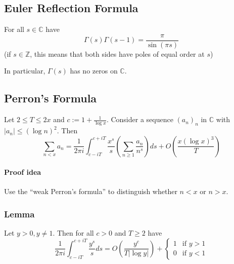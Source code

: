 \documentclass{scrartcl}
\newcommand{\Z}{\mathbb{Z}}
\newcommand{\C}{\mathbb{C}}
\begin{document}
\subsection{Euler Reflection Formula}
For all $s \in \C$ have
\begin{equation*}
    \Gamma(s)\Gamma(s - 1) = \frac \pi {\sin(\pi s)}
\end{equation*}
(if $s \in \Z$, this means that both sides have poles of equal order at $s$)

In particular, $\Gamma(s)$ has no zeros on $\C$.

\subsection{Perron's Formula}
Let $2 \leq T \leq 2x$ and $c := 1 + \frac 1 {\log x}$. Consider a sequence $(a_n)_n$ in $\C$ with $|a_n| \leq (\log n)^2$. Then
\begin{equation*}
    \sum_{n < x} a_n = \frac 1 {2\pi i} \int_{c - iT}^{c + iT} \frac {x^s} s \left( \sum_{n \geq 1} \frac {a_n} {n^s} \right) ds + O\left(\frac {x(\log x)^3} T\right)
\end{equation*}
\paragraph{Proof idea} Use the ``weak Perron's formula'' to distinguish whether $n < x$ or $n > x$.
\subsubsection*{Lemma}
Let $y > 0, y \neq 1$. Then for all $c > 0$ and $T \geq 2$ have
\begin{equation*}
    \frac 1 {2\pi i} \int_{c - iT}^{c + iT} \frac {y^s} s ds = O\left( \frac {y^c} {T |\log y|} \right) + \begin{cases}
        1 & \text{if $y > 1$} \\
        0 & \text{if $y < 1$}
    \end{cases}
\end{equation*}
\end{document}
